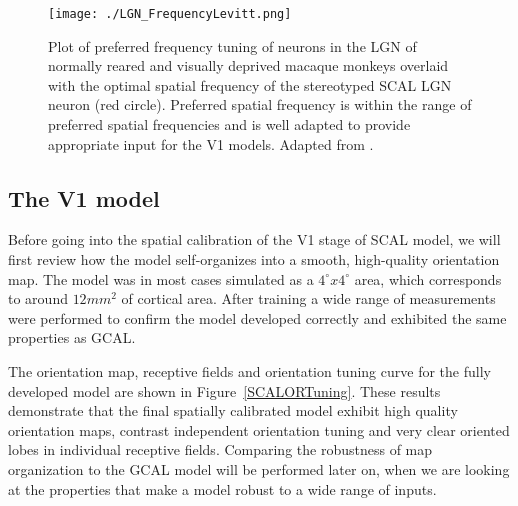 \begin{figure}
	\centering
    \texttt{[image: ./LGN\_FrequencyLevitt.png]}
	\caption[Spatial frequency preference in SCAL compared to
      experiment. Adapted from \cite{Levitt2001}.]{Plot of preferred
      frequency tuning of neurons in the LGN of normally reared and
      visually deprived macaque monkeys overlaid with the optimal
      spatial frequency of the stereotyped SCAL LGN neuron (red
      circle). Preferred spatial frequency is within the range of
      preferred spatial frequencies and is well adapted to provide
      appropriate input for the V1 models. Adapted from
      \cite{Levitt2001}.}
	\label{LGNFrequencyLevitt}
\end{figure}

\subsection{The V1 model}

Before going into the spatial calibration of the V1 stage of SCAL
model, we will first review how the model self-organizes into a
smooth, high-quality orientation map. The model was in most cases
simulated as a $4^\circ x 4^\circ$ area, which corresponds to around
$12 mm^2$ of cortical area. After training a wide range of
measurements were performed to confirm the model developed correctly
and exhibited the same properties as GCAL.

The orientation map, receptive fields and orientation tuning curve for
the fully developed model are shown in
Figure~\ref{SCALORTuning}. These results demonstrate that the final
spatially calibrated model exhibit high quality orientation maps,
contrast independent orientation tuning and very clear oriented lobes
in individual receptive fields. Comparing the robustness of map
organization to the GCAL model will be performed later on, when we are
looking at the properties that make a model robust to a wide range of
inputs.

